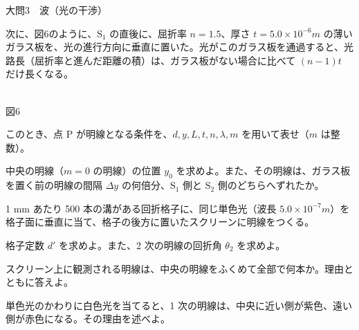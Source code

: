 \documentclass[paper=b5, fontsize=8pt, fleqn, twoside]{jlreq}
\begin{document}
\begin{ascolorbox4A}[75点・30分]{大問3　波（光の干渉）}
\par\noindent
\begin{minipage}[t]{0.56\linewidth}\vspace{0pt}
次に、図6のように、$\mathrm{S}_1$ の直後に、屈折率 $n=1.5$、厚さ $t=5.0\times10^{-6}\unit{m}$ の薄いガラス板を、光の進行方向に垂直に置いた。光がこのガラス板を通過すると、光路長（屈折率と進んだ距離の積）は、ガラス板がない場合に比べて $(n-1)t$ だけ長くなる。
\end{minipage}\hfill
\begin{minipage}[t]{0.40\linewidth}\vspace{0pt}\centering
{}\\[1pt]{\small 図6}
\end{minipage}
\begin{qlist}[resume*=tc]
\item このとき、点 $\mathrm{P}$ が明線となる条件を、$d,y,L,t,n,\lambda,m$ を用いて表せ（$m$ は整数）。
\item 中央の明線（$m=0$ の明線）の位置 $y_0$ を求めよ。また、その明線は、ガラス板を置く前の明線の間隔 $\Delta y$ の何倍分、$\mathrm{S}_1$ 側と $\mathrm{S}_2$ 側のどちらへずれたか。
\end{qlist}
1 mm あたり 500 本の溝がある回折格子に、同じ単色光（波長 $5.0\times10^{-7}\unit{m}$）を格子面に垂直に当て、格子の後方に置いたスクリーンに明線をつくる。
\begin{qlist}[resume*=tc]
\item 格子定数 $d'$ を求めよ。また、2 次の明線の回折角 $\theta_2$ を求めよ。
\item スクリーン上に観測される明線は、中央の明線をふくめて全部で何本か。理由とともに答えよ。
\item 単色光のかわりに白色光を当てると、1 次の明線は、中央に近い側が紫色、遠い側が赤色になる。その理由を述べよ。
\end{qlist}
\end{ascolorbox4A}
\end{document}
